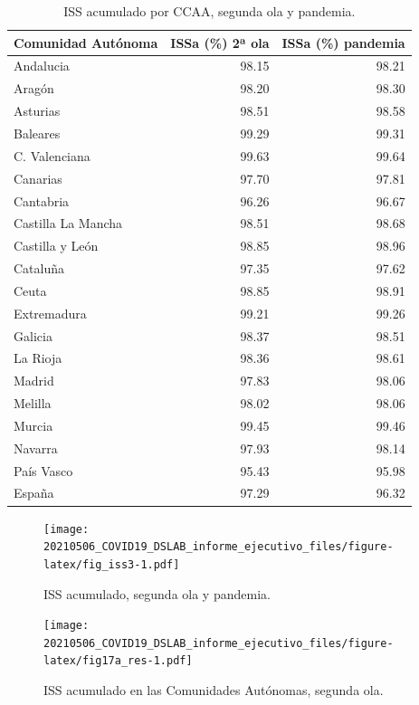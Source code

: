 \documentclass[
  11pt,
]{article}
\begin{document}
\begin{table}[!h]

\caption{\label{tab:tabla}ISS acumulado por CCAA, segunda ola y pandemia.}
\centering
\fontsize{9}{11}\selectfont
\begin{tabular}[t]{l|r|r}
\hline
Comunidad Autónoma & ISSa (\%) 2ª ola & ISSa (\%) pandemia\\
\hline
Andalucia & 98.15 & 98.21\\
\hline
Aragón & 98.20 & 98.30\\
\hline
Asturias & 98.51 & 98.58\\
\hline
Baleares & 99.29 & 99.31\\
\hline
C. Valenciana & 99.63 & 99.64\\
\hline
Canarias & 97.70 & 97.81\\
\hline
Cantabria & 96.26 & 96.67\\
\hline
Castilla La Mancha & 98.51 & 98.68\\
\hline
Castilla y León & 98.85 & 98.96\\
\hline
Cataluña & 97.35 & 97.62\\
\hline
Ceuta & 98.85 & 98.91\\
\hline
Extremadura & 99.21 & 99.26\\
\hline
Galicia & 98.37 & 98.51\\
\hline
La Rioja & 98.36 & 98.61\\
\hline
Madrid & 97.83 & 98.06\\
\hline
Melilla & 98.02 & 98.06\\
\hline
Murcia & 99.45 & 99.46\\
\hline
Navarra & 97.93 & 98.14\\
\hline
País Vasco & 95.43 & 95.98\\
\hline
España & 97.29 & 96.32\\
\hline
\end{tabular}
\end{table}

\begin{figure}
\centering
\texttt{[image: 20210506\_COVID19\_DSLAB\_informe\_ejecutivo\_files/figure-latex/fig\_iss3-1.pdf]}
\caption{\label{fig:fig_iss3} ISS acumulado, segunda ola y pandemia.}
\end{figure}

\vspace{0.2cm}

\begin{figure}
\centering
\texttt{[image: 20210506\_COVID19\_DSLAB\_informe\_ejecutivo\_files/figure-latex/fig17a\_res-1.pdf]}
\caption{\label{fig:fig17a_res} ISS acumulado en las Comunidades
Autónomas, segunda ola.}
\end{figure}
\end{document}
